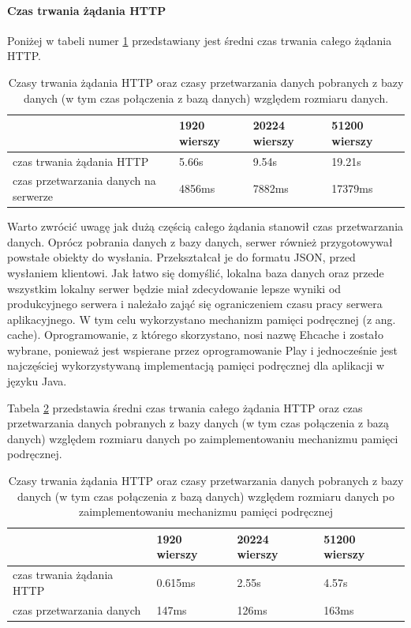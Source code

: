 \documentclass[a4paper,12pt,twoside]{article}
\begin{document}
\paragraph{Czas trwania żądania HTTP}
Poniżej w tabeli numer \ref{table:httpRequestTime} przedstawiany jest średni czas trwania całego żądania HTTP.
\begin{table}[H]
\begin{tabular}{| p{3cm} | p{3cm} | p{3cm} | p{3cm}|}
\hline
& 1920 wierszy & 20224 wierszy & 51200 wierszy\\
\hline
czas trwania żądania HTTP& 5.66s & 9.54s & 19.21s \\ \hline
czas przetwarzania danych na serwerze& 4856ms& 7882ms& 17379ms\\ \hline
\end{tabular}
\caption{Czasy trwania żądania HTTP oraz czasy przetwarzania danych pobranych z bazy danych (w tym czas połączenia z bazą danych) względem rozmiaru danych. }
\label{table:httpRequestTime}
\end{table}
Warto zwrócić uwagę jak dużą częścią całego żądania stanowił czas przetwarzania danych. Oprócz pobrania danych z bazy danych, serwer również przygotowywał
powstałe obiekty do wysłania. Przekształcał je do formatu JSON, przed wysłaniem
klientowi.
Jak łatwo się domyślić, lokalna baza danych oraz przede wszystkim lokalny serwer będzie miał zdecydowanie lepsze wyniki od produkcyjnego serwera i należało
zająć się ograniczeniem czasu pracy serwera aplikacyjnego.
W tym celu wykorzystano mechanizm pamięci podręcznej (z ang. cache).
Oprogramowanie, z którego skorzystano, nosi nazwę Ehcache \cite{cache} i
zostało wybrane, ponieważ jest wspierane przez oprogramowanie Play
i jednocześnie jest najczęściej wykorzystywaną implementacją pamięci podręcznej
dla aplikacji w języku Java.

Tabela \ref{table:httpRequestTimeCache} przedstawia średni czas trwania
całego żądania HTTP oraz czas przetwarzania danych pobranych z bazy danych
(w tym czas połączenia z bazą danych) względem rozmiaru danych po zaimplementowaniu
mechanizmu pamięci podręcznej.
\begin{table} [H]
\begin{tabular}{| p{3cm} | p{3cm} | p{3cm} | p{3cm}|}
\hline
& 1920 wierszy & 20224 wierszy & 51200 wierszy\\
\hline
czas trwania żądania HTTP& 0.615ms & 2.55s& 4.57s \\ \hline
czas przetwarzania danych& 147ms& 126ms& 163ms\\ \hline
\end{tabular}
\caption{Czasy trwania żądania HTTP oraz czasy przetwarzania danych pobranych z bazy danych (w tym czas połączenia z bazą danych) względem rozmiaru danych po zaimplementowaniu mechanizmu pamięci podręcznej}
\label{table:httpRequestTimeCache}
\end{table}
\end{document}
